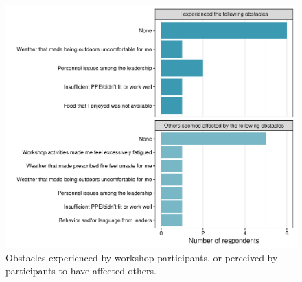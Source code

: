 \documentclass[fire,casereport,accept,moreauthors,pdftex]{Definitions/mdpi}  %
\begin{document}
\begin{figure}[H]

\includegraphics[width=0.8\columnwidth]{obstacles_gg-1.pdf}
\caption{Obstacles experienced by workshop participants, or perceived by participants to have affected others. \label{obstacles}}
\end{figure}
\end{document}
